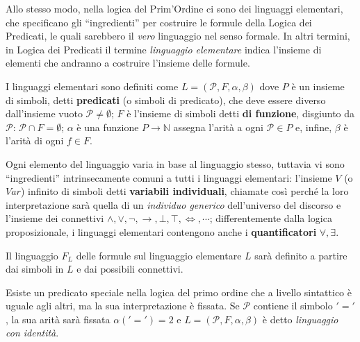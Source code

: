 Allo stesso modo, nella logica del Prim'Ordine ci sono dei linguaggi elementari, 
che specificano gli ``ingredienti'' per costruire le formule della Logica dei 
Predicati, le quali sarebbero il \textit{vero} linguaggio nel senso formale. 
In altri termini, in Logica dei Predicati 
il termine \textit{linguaggio elementare} indica l'insieme di elementi che andranno 
a costruire l'insieme delle formule. 

\begin{defi}
I linguaggi elementari sono definiti come $L = (\mathcal{P}, F, \alpha, \beta)$  dove $P$ è un insieme di 
simboli, detti \textbf{predicati} (o simboli di predicato), che deve 
essere diverso dall'insieme vuoto $\mathcal{P} \neq \emptyset$; $F$ è l'insieme 
di simboli detti \textbf{di funzione}, disgiunto da $\mathcal{P}$: $\mathcal{P} \cap F = \emptyset$; 
$\alpha$ è una funzione $P \rightarrow \mathbb{N}$ assegna l'arità a ogni 
$\mathcal{P} \in P$ e, infine, $\beta$ è  l'arità di ogni $f \in F$.
\end{defi}

Ogni elemento del linguaggio varia in base al linguaggio stesso, tuttavia 
vi sono ``ingredienti'' intrinsecamente comuni a tutti i linguaggi elementari:  
l'insieme $V$ (o $Var$) infinito di simboli detti \textbf{variabili individuali}, 
chiamate così perché la loro interpretazione sarà quella di un \textit{individuo 
generico} dell'universo del discorso
e l'insieme dei connettivi $\land, \lor, \neg, \rightarrow, \bot, \top, \iff, \cdots$; 
differentemente dalla logica proposizionale, i linguaggi elementari contengono 
anche i \textbf{quantificatori} $\forall, \exists$. 

Il linguaggio $F_L$ delle formule sul linguaggio elementare $L$ sarà definito 
a partire dai simboli in $L$ e dai possibili connettivi. 

\begin{oss}
        Esiste un predicato speciale nella logica del primo ordine 
        che a livello sintattico è uguale agli altri, ma la sua interpretazione 
        è fissata. Se $\mathcal{P}$ contiene il simbolo $'='$, la sua arità 
        sarà fissata $\alpha('=') = 2$ e $L = (\mathcal{P}, F, \alpha, \beta)$ 
        è detto \textit{linguaggio con identità}.
\end{oss}

